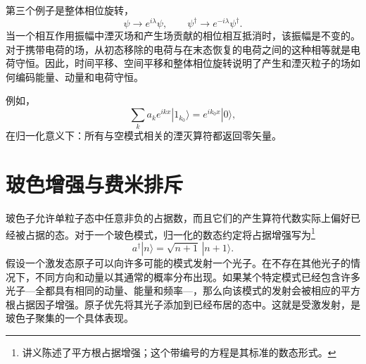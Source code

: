 第三个例子是整体相位旋转，
\begin{equation}
\psi\longrightarrow e^{i\lambda}\psi,
\qquad
\psi^\dagger\longrightarrow e^{-i\lambda}\psi^\dagger.
\end{equation}
当一个相互作用振幅中湮灭场和产生场贡献的相位相互抵消时，该振幅是不变的。对于携带电荷的场，从初态移除的电荷与在末态恢复的电荷之间的这种相等就是电荷守恒。因此，时间平移、空间平移和整体相位旋转说明了产生和湮灭粒子的场如何编码能量、动量和电荷守恒。

\begin{classroomqa}
\end{classroomqa}

\begin{classroomqa}
\end{classroomqa}

\begin{classroomqa}
\end{classroomqa}

例如，
\begin{equation}
\sum_k a_k e^{ikx}|1_{k_0}\rangle
=e^{ik_0x}|0\rangle,
\end{equation}
在归一化意义下：所有与空模式相关的湮灭算符都返回零矢量。

\section{玻色增强与费米排斥}

玻色子允许单粒子态中任意非负的占据数，而且它们的产生算符代数实际上偏好已经被占据的态。对于一个玻色模式，归一化的数态约定将占据增强写为\footnote{讲义陈述了平方根占据增强；这个带编号的方程是其标准的数态形式。}
\begin{equation}
a^\dagger|n\rangle=\sqrt{n+1}\,|n+1\rangle.
\end{equation}
假设一个激发态原子可以向许多可能的模式发射一个光子。在不存在其他光子的情况下，不同方向和动量以其通常的概率分布出现。如果某个特定模式已经包含许多光子---全都具有相同的动量、能量和频率---，那么向该模式的发射会被相应的平方根占据因子增强。原子优先将其光子添加到已经布居的态中。这就是受激发射，是玻色子聚集的一个具体表现。

